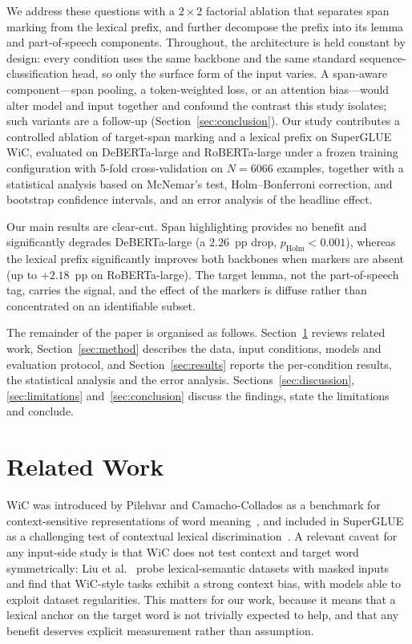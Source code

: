 \documentclass[runningheads]{llncs}
\begin{document}
We address these questions with a $2 \times 2$ factorial ablation that separates
span marking from the lexical prefix, and further decompose the prefix into its
lemma and part-of-speech components. Throughout, the architecture is held
constant by design: every condition uses the same backbone and the same standard
sequence-classification head, so only the surface form of the input varies. A
span-aware component---span pooling, a token-weighted loss, or an attention
bias---would alter model and input together and confound the contrast this study
isolates; such variants are a follow-up (Section~\ref{sec:conclusion}). Our
study contributes a controlled ablation
of target-span marking and a lexical prefix on SuperGLUE WiC, evaluated on
DeBERTa-large and RoBERTa-large under a frozen training configuration with
5-fold cross-validation on $N = 6066$ examples, together with a statistical
analysis based on McNemar's test, Holm--Bonferroni correction, and bootstrap
confidence intervals, and an error analysis of the headline effect.

Our main results are clear-cut. Span highlighting provides no benefit and
significantly degrades DeBERTa-large (a $2.26$~pp drop, $p_{\text{Holm}} <
0.001$), whereas the lexical prefix significantly improves both backbones when
markers are absent (up to $+2.18$~pp on RoBERTa-large). The target lemma, not
the part-of-speech tag, carries the signal, and the effect of the markers is
diffuse rather than concentrated on an identifiable subset.

The remainder of the paper is organised as follows.
Section~\ref{sec:related} reviews related work, Section~\ref{sec:method}
describes the data, input conditions, models and evaluation protocol, and
Section~\ref{sec:results} reports the per-condition results, the statistical
analysis and the error analysis. Sections~\ref{sec:discussion},
\ref{sec:limitations} and~\ref{sec:conclusion} discuss the findings, state the
limitations and conclude.

\section{Related Work}
\label{sec:related}

WiC was introduced by Pilehvar and Camacho-Collados as a benchmark for
context-sensitive representations of word meaning~\cite{pilehvar2019wic}, and
included in SuperGLUE as a challenging test of contextual lexical
discrimination~\cite{wang2019superglue}. A relevant caveat for any input-side
study is that WiC does not test context and target word symmetrically: Liu et
al.~\cite{liu2021context} probe lexical-semantic datasets with masked inputs and
find that WiC-style tasks exhibit a strong context bias, with models able to
exploit dataset regularities. This matters for our work, because it means that a
lexical anchor on the target word is not trivially expected to help, and that
any benefit deserves explicit measurement rather than assumption.
\end{document}
